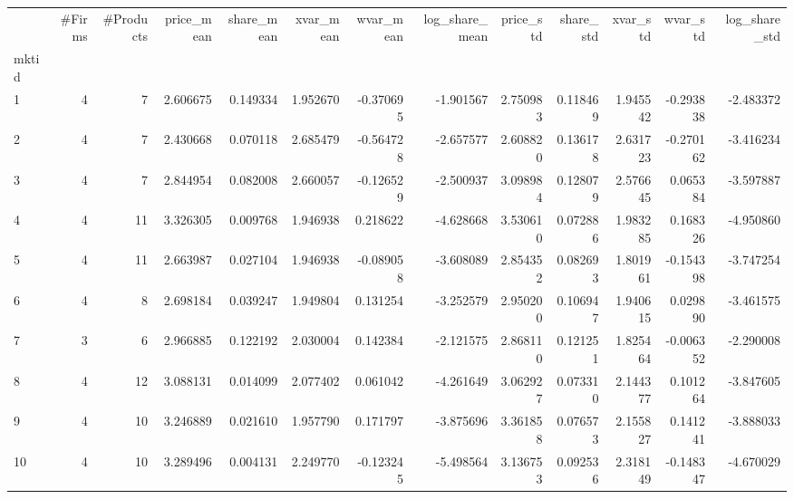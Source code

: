 \begin{tabular}{lrrrrrrrrrrrr}
\toprule
{} &  \#Firms &  \#Products &  price\_mean &  share\_mean &  xvar\_mean &  wvar\_mean &  log\_share\_mean &  price\_std &  share\_std &  xvar\_std &  wvar\_std &  log\_share\_std \\
mktid &         &            &             &             &            &            &                 &            &            &           &           &                \\
\midrule
1     &       4 &          7 &    2.606675 &    0.149334 &   1.952670 &  -0.370695 &       -1.901567 &   2.750983 &   0.118469 &  1.945542 & -0.293838 &      -2.483372 \\
2     &       4 &          7 &    2.430668 &    0.070118 &   2.685479 &  -0.564728 &       -2.657577 &   2.608820 &   0.136178 &  2.631723 & -0.270162 &      -3.416234 \\
3     &       4 &          7 &    2.844954 &    0.082008 &   2.660057 &  -0.126529 &       -2.500937 &   3.098984 &   0.128079 &  2.576645 &  0.065384 &      -3.597887 \\
4     &       4 &         11 &    3.326305 &    0.009768 &   1.946938 &   0.218622 &       -4.628668 &   3.530610 &   0.072886 &  1.983285 &  0.168326 &      -4.950860 \\
5     &       4 &         11 &    2.663987 &    0.027104 &   1.946938 &  -0.089058 &       -3.608089 &   2.854352 &   0.082693 &  1.801961 & -0.154398 &      -3.747254 \\
6     &       4 &          8 &    2.698184 &    0.039247 &   1.949804 &   0.131254 &       -3.252579 &   2.950200 &   0.106947 &  1.940615 &  0.029890 &      -3.461575 \\
7     &       3 &          6 &    2.966885 &    0.122192 &   2.030004 &   0.142384 &       -2.121575 &   2.868110 &   0.121251 &  1.825464 & -0.006352 &      -2.290008 \\
8     &       4 &         12 &    3.088131 &    0.014099 &   2.077402 &   0.061042 &       -4.261649 &   3.062927 &   0.073310 &  2.144377 &  0.101264 &      -3.847605 \\
9     &       4 &         10 &    3.246889 &    0.021610 &   1.957790 &   0.171797 &       -3.875696 &   3.361858 &   0.076573 &  2.155827 &  0.141241 &      -3.888033 \\
10    &       4 &         10 &    3.289496 &    0.004131 &   2.249770 &  -0.123245 &       -5.498564 &   3.136753 &   0.092536 &  2.318149 & -0.148347 &      -4.670029 \\

\end{tabular}
